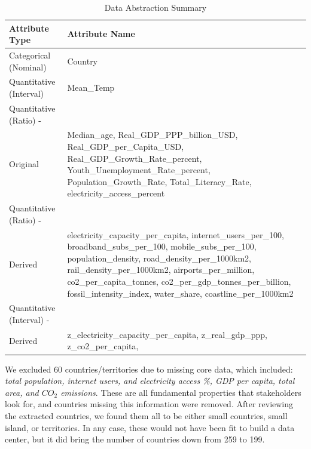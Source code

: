 \documentclass{vgtc}                          %
\begin{document}
\begin{table}[h]
    \centering
    \caption{Data Abstraction Summary}
    \label{tab:data-abstraction}
    \renewcommand{\arraystretch}{1.2}
    
    \setlength{\tabcolsep}{2pt} %
    \begin{tabular}{p{} p{}}
        \textbf{Attribute Type} & \textbf{Attribute Name} \\
        \hline
Categorical (Nominal) &
Country\\[2pt]

Quantitative (Interval) &
Mean\_Temp \\[2pt]

Quantitative (Ratio) -\\
Original &
Median\_age,
Real\_GDP\_PPP\_billion\_USD, 
Real\_GDP\_per\_Capita\_USD,
Real\_GDP\_Growth\_Rate\_percent,
Youth\_Unemployment\_Rate\_percent,
Population\_Growth\_Rate,
Total\_Literacy\_Rate,
electricity\_access\_percent \\[2pt]

Quantitative (Ratio) -\\   
Derived &

electricity\_capacity\_per\_capita, 
internet\_users\_per\_100,
broadband\_subs\_per\_100,
mobile\_subs\_per\_100,
population\_density,
road\_density\_per\_1000km2,
rail\_density\_per\_1000km2,
airports\_per\_million,
co2\_per\_capita\_tonnes, 
co2\_per\_gdp\_tonnes\_per\_billion,
fossil\_intensity\_index,
water\_share,
coastline\_per\_1000km2\\

Quantitative (Interval) -\\   
Derived &
z\_electricity\_capacity\_per\_capita,
z\_real\_gdp\_ppp,
z\_co2\_per\_capita,
    \end{tabular}
\end{table}
\noindent We excluded 60 countries/territories due to missing core data, which included: \textit{total population, internet users, and electricity access \%, GDP per capita, total area, and $CO_2$ emissions}. These are all fundamental properties that stakeholders look for, and countries missing this information were removed. After reviewing the extracted countries, we found them all to be either small countries, small island, or territories. In any case, these would not have been fit to build a data center, but it did bring the number of countries down from 259 to 199.
\smallskip
\end{document}
